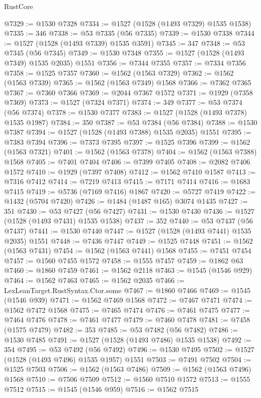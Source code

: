 \begin{lexlean}{RustCore}
\begin{coremodule}
@7329 := @1530 @7328
@7334 := @1527 (@1528 (@1493 @7329) @1535 @1538)
@7335 := 346
@7338 := @53 @7335 (@56 @7335)
@7339 := @1530 @7338
@7344 := @1527 (@1528 (@1493 @7339) @1535 @3591)
@7345 := 347
@7348 := @53 @7345 (@56 @7345)
@7349 := @1530 @7348
@7355 := @1527 (@1528 (@1493 @7349) @1535 @2035) @1551
@7356 := @7344 @7355
@7357 := @7334 @7356
@7358 := @1525 @7357
@7360 := @1562 (@1563 @7329)
@7362 := @1562 (@1563 @7339)
@7365 := @1562 (@1563 @7349) @1568
@7366 := @7362 @7365
@7367 := @7360 @7366
@7369 := @2044 @7367 @1572
@7371 := @1929 (@7358 @7369)
@7373 := @1527 (@7324 @7371)
@7374 := 349
@7377 := @53 @7374 (@56 @7374)
@7378 := @1530 @7377
@7383 := @1527 (@1528 (@1493 @7378) @1535 @1987)
@7384 := 350
@7387 := @53 @7384 (@56 @7384)
@7388 := @1530 @7387
@7394 := @1527 (@1528 (@1493 @7388) @1535 @2035) @1551
@7395 := @7383 @7394
@7396 := @7373 @7395
@7397 := @1525 @7396
@7399 := @1562 (@1563 @7321)
@7401 := @1562 (@1563 @7378)
@7404 := @1562 (@1563 @7388) @1568
@7405 := @7401 @7404
@7406 := @7399 @7405
@7408 := @2082 @7406 @1572
@7410 := @1929 (@7397 @7408)
@7412 := @1562 @7410 @1587
@7413 := @7316 @7412
@7414 := @7219 @7413
@7415 := @7171 @7414
@7416 := @1683 @7415
@7419 := @5736 (@7169 @7416) @1867
@7420 := @5727 @7419
@7422 := @1432 (@5704 @7420)
@7426 := @1484 (@1487 @165) @3074 @1435
@7427 := 351
@7430 := @53 @7427 (@56 @7427)
@7431 := @1530 @7430
@7436 := @1527 (@1528 (@1493 @7431) @1535 @1538)
@7437 := 352
@7440 := @53 @7437 (@56 @7437)
@7441 := @1530 @7440
@7447 := @1527 (@1528 (@1493 @7441) @1535 @2035) @1551
@7448 := @7436 @7447
@7449 := @1525 @7448
@7451 := @1562 (@1563 @7431)
@7454 := @1562 (@1563 @7441) @1568
@7455 := @7451 @7454
@7457 := @1560 @7455 @1572
@7458 := @1555 @7457
@7459 := @1862 @63
@7460 := @1860 @7459
@7461 := @1562 @2118
@7463 := @1545 (@1546 @929)
@7464 := @1562 @7463
@7465 := @1562 @2035
@7466 := LexLeanTarget.RustSyntax.Ctor.some
@7467 := @1860 @7466
@7469 := @1545 (@1546 @939)
@7471 := @1562 @7469 @1568
@7472 := @7467 @7471
@7474 := @1562 @7472 @1568
@7475 := @7465 @7474
@7476 := @7461 @7475
@7477 := @7464 @7476
@7478 := @7461 @7477
@7479 := @7460 @7478
@7481 := @7458 (@1575 @7479)
@7482 := 353
@7485 := @53 @7482 (@56 @7482)
@7486 := @1530 @7485
@7491 := @1527 (@1528 (@1493 @7486) @1535 @1538)
@7492 := 354
@7495 := @53 @7492 (@56 @7492)
@7496 := @1530 @7495
@7502 := @1527 (@1528 (@1493 @7496) @1535 @1957) @1551
@7503 := @7491 @7502
@7504 := @1525 @7503
@7506 := @1562 (@1563 @7486)
@7509 := @1562 (@1563 @7496) @1568
@7510 := @7506 @7509
@7512 := @1560 @7510 @1572
@7513 := @1555 @7512
@7515 := @1545 (@1546 @959)
@7516 := @1562 @7515

\end{coremodule}
\end{lexlean}

